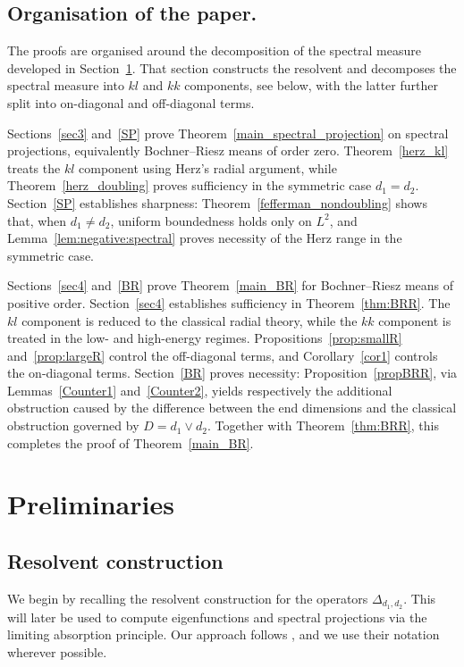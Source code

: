 \documentclass[12pt]{amsart}
\newcommand\Lapd{\Delta_{d_1, d_2}}
\begin{document}
\subsection{Organisation of the paper.}
The proofs are organised around the decomposition of the spectral measure
developed in Section~\ref{sec2}. That section constructs the resolvent and decomposes the spectral
measure into \(kl\) and \(kk\) components, see below, with the latter further split into
on-diagonal and off-diagonal terms.

Sections~\ref{sec3} and~\ref{SP} prove Theorem~\ref{main_spectral_projection} on spectral projections, equivalently
Bochner--Riesz means of order zero. Theorem~\ref{herz_kl} treats the \(kl\) component
using Herz's radial argument, while Theorem~\ref{herz_doubling} proves sufficiency in the
symmetric case \(d_1=d_2\). Section~\ref{SP} establishes sharpness: Theorem~\ref{fefferman_nondoubling}
shows that, when \(d_1\neq d_2\), uniform boundedness holds only on \(L^2\),
and Lemma~\ref{lem:negative:spectral} proves necessity of the Herz range in the symmetric case.

Sections~\ref{sec4} and~\ref{BR} prove Theorem~\ref{main_BR} for Bochner--Riesz means of positive
order. Section~\ref{sec4} establishes sufficiency in Theorem~\ref{thm:BRR}. The \(kl\)
component is reduced to the classical radial theory, while the \(kk\)
component is treated in the low- and high-energy regimes. Propositions~\ref{prop:smallR}
and~\ref{prop:largeR} control the off-diagonal terms, and Corollary~\ref{cor1} controls the
on-diagonal terms. Section~\ref{BR} proves necessity: Proposition~\ref{propBRR}, via
Lemmas~\ref{Counter1} and~\ref{Counter2}, yields respectively the additional obstruction caused
by the difference between the end dimensions and the classical obstruction
governed by \(D=d_1\vee d_2\). Together with Theorem~\ref{thm:BRR}, this completes the
proof of Theorem~\ref{main_BR}. 


\section{Preliminaries}\label{sec2}

\subsection{Resolvent construction}

We begin by recalling the resolvent construction for the operators \(\Lapd\).
This will later be used to compute eigenfunctions and spectral projections
via the limiting absorption principle. Our approach follows
\cite{HS1D,HE_phd,Nix}, and we use their notation wherever possible.
\end{document}
